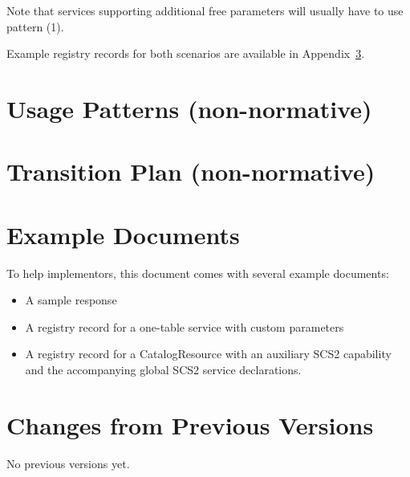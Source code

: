 \documentclass[11pt,a4paper]{ivoa}
\begin{document}
Note that services supporting additional free parameters will usually
have to use pattern (1).

Example registry records for both scenarios are available in
Appendix~\ref{app:examples}.


\appendix
\section{Usage Patterns (non-normative)}

\section{Transition Plan (non-normative)}

\section{Example Documents}
\label{app:examples}

To help implementors, this document comes with several example documents:

\begin{itemize}
\item A sample response
\item A registry record for a one-table service with custom parameters
\item A registry record for a CatalogResource with an auxiliary SCS2
capability and the accompanying global SCS2 service declarations.
\end{itemize}

\section{Changes from Previous Versions}

No previous versions yet.



\end{document}
